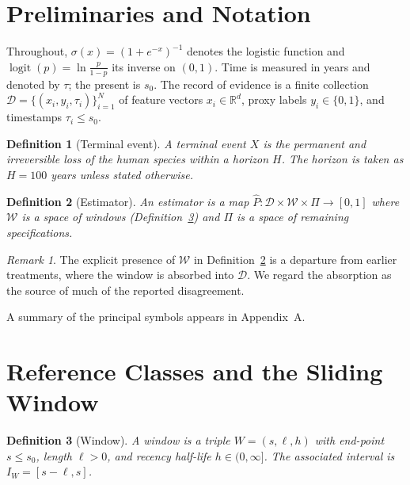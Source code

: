 \documentclass[11pt]{article}
\newtheorem{definition}{Definition}[section]
\theoremstyle{remark}
\newtheorem{remark}{Remark}[section]
\DeclareMathOperator{\logit}{logit}
\newcommand{\R}{\mathbb{R}}
\begin{document}
\section{Preliminaries and Notation}

Throughout, $\sigma(x)=(1+e^{-x})^{-1}$ denotes the logistic function and $\logit(p)=\ln\frac{p}{1-p}$ its inverse on $(0,1)$. Time is measured in years and denoted by $\tau$; the present is $s_0$. The record of evidence is a finite collection $\mathcal{D}=\{(x_i,y_i,\tau_i)\}_{i=1}^{N}$ of feature vectors $x_i\in\R^{d}$, proxy labels $y_i\in\{0,1\}$, and timestamps $\tau_i\le s_0$.

\begin{definition}[Terminal event]\label{def:terminal}
A \emph{terminal event} $X$ is the permanent and irreversible loss of the human species within a horizon $H$. The horizon is taken as $H=100$ years unless stated otherwise.
\end{definition}

\begin{definition}[Estimator]\label{def:estimator}
An \emph{estimator} is a map $\widehat{P}:\mathcal{D}\times\mathcal{W}\times\Pi\to[0,1]$ where $\mathcal{W}$ is a space of windows (Definition~\ref{def:window}) and $\Pi$ is a space of remaining specifications.
\end{definition}

\begin{remark}
The explicit presence of $\mathcal{W}$ in Definition~\ref{def:estimator} is a departure from earlier treatments, where the window is absorbed into $\mathcal{D}$. We regard the absorption as the source of much of the reported disagreement.
\end{remark}

A summary of the principal symbols appears in Appendix~A.

\section{Reference Classes and the Sliding Window}\label{sec:window}

\begin{definition}[Window]\label{def:window}
A \emph{window} is a triple $W=(s,\ell,h)$ with end-point $s\le s_0$, length $\ell>0$, and recency half-life $h\in(0,\infty]$. The associated interval is $I_W=[s-\ell,s]$.
\end{definition}
\end{document}
